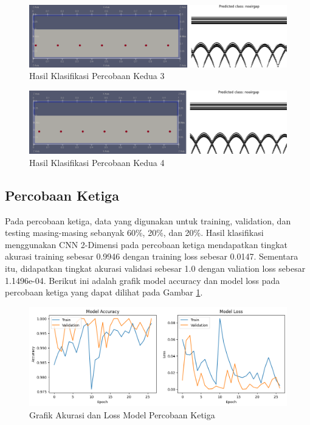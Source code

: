 \begin{figure} [H] \centering
    \includegraphics[scale=0.2]{gambar/bab4/Noarigap 19002.png}
    \caption{Hasil Klasifikasi Percobaan Kedua 3}
\end{figure}

\begin{figure} [H] \centering
    \includegraphics[scale=0.2]{gambar/bab4/Noairgap 20002.png}
    \caption{Hasil Klasifikasi Percobaan Kedua 4}
\end{figure}

\subsection{Percobaan Ketiga}
Pada percobaan ketiga, data yang digunakan untuk training, validation, dan testing masing-masing sebanyak 60\%, 20\%, dan 20\%. Hasil klasifikasi menggunakan CNN 2-Dimensi pada percobaan ketiga mendapatkan tingkat akurasi training sebesar 0.9946 dengan training loss sebesar 0.0147. Sementara itu, didapatkan tingkat akurasi validasi sebesar 1.0 dengan valiation loss sebesar 1.1496e-04. Berikut ini adalah grafik model accuracy dan model loss pada percobaan ketiga yang dapat dilihat pada Gambar \ref{fig:trainres3}.

\begin{figure} [H] \centering
    \includegraphics[scale=0.5]{gambar/bab4/trainres3.png}
    \caption{Grafik Akurasi dan Loss Model Percobaan Ketiga}
    \label{fig:trainres3}
\end{figure}

